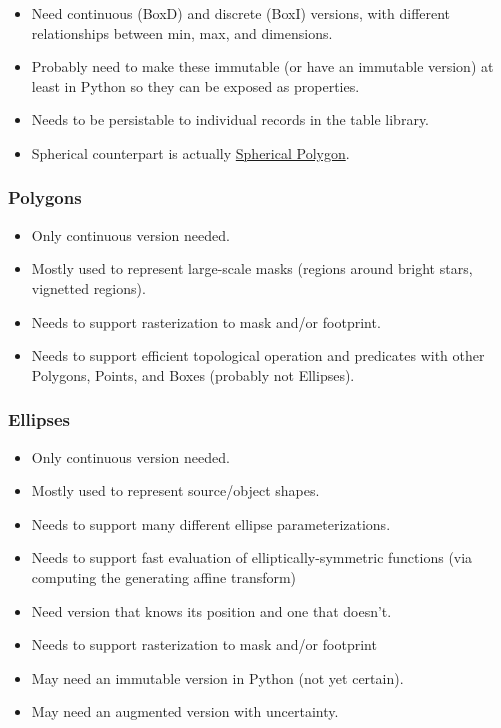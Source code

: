 \begin{itemize}
\item Need continuous (BoxD) and discrete (BoxI) versions, with different relationships between min, max, and dimensions.
\item Probably need to make these immutable (or have an immutable version) at least in Python so they can be exposed as properties.
\item Needs to be persistable to individual records in the table library.
\item Spherical counterpart is actually \hyperref[sec:spSphericalPolygons]{Spherical Polygon}.
\end{itemize}

\subsubsection{Polygons}
\label{sec:spCartesianPolygons}

\begin{itemize}
\item Only continuous version needed.
\item Mostly used to represent large-scale masks (regions around bright stars, vignetted regions).
\item Needs to support rasterization to mask and/or footprint.
\item Needs to support efficient topological operation and predicates with other Polygons, Points, and Boxes (probably not Ellipses).
\end{itemize}

\subsubsection{Ellipses}
\label{sec:spCartesianEllipses}

\begin{itemize}
\item Only continuous version needed.
\item Mostly used to represent source/object shapes.
\item Needs to support many different ellipse parameterizations.
\item Needs to support fast evaluation of elliptically-symmetric functions (via computing the generating affine transform)
\item Need version that knows its position and one that doesn't.
\item Needs to support rasterization to mask and/or footprint
\item May need an immutable version in Python (not yet certain).
\item May need an  augmented version with uncertainty.
\end{itemize}


